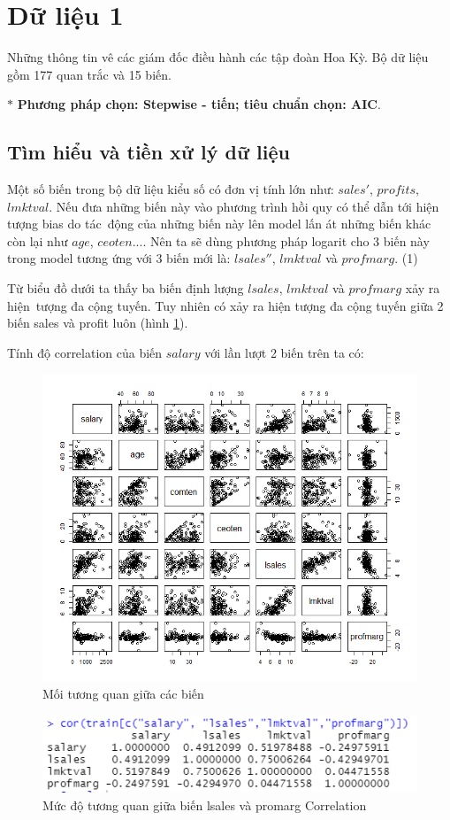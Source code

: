 \section{Dữ liệu 1}
Những thông tin vê các giám đốc điều hành các tập đoàn Hoa Kỳ. Bộ dữ liệu gồm 177 quan trắc và 15 biến.

$*$ \textbf{Phương pháp chọn: Stepwise - tiến; tiêu chuẩn chọn: AIC}.
\subsection*{Tìm hiểu và tiền xử lý dữ liệu}

Một số biến trong bộ dữ liệu kiểu số có đơn vị tính lớn như: $sales'$, $profits$, $lmktval$. Nếu đưa những biến này vào phương trình hồi quy có thể dẫn tới hiện tượng bias do tác~động của những biến này lên model lấn át những biến khác còn lại như $age$, $ceoten$.... Nên ta sẽ dùng phương pháp logarit cho 3 biến này trong model tương ứng với 3 biến mới là:  $lsales''$, $lmktval$   và $profmarg$. (1)


Từ biểu đồ dưới ta thấy ba biến định lượng $\textit{lsales}$, $\textit{lmktval}$ và $\textit{profmarg}$ xảy ra hiện~tượng đa cộng tuyến.
Tuy nhiên có xảy ra hiện tượng đa cộng tuyến giữa 2 biến sales và profit luôn (hình \ref{fig-b1:plot-vars}).

Tính độ correlation của biến $salary$ với lần lượt 2 biến trên ta có:

\begin{figure}[H]
	\centering
	\includegraphics[width=.7\linewidth]{../Photo Of Result/B1_plotVriables.png}  
	\caption{Mối tương quan giữa các biến}
	\label{fig-b1:plot-vars}
\end{figure}

\begin{figure}[H]
	\centering
	\includegraphics[width=.7\linewidth]{../Photo Of Result/B1_CorTable.PNG}  
	\caption{Mức độ tương quan giữa biến lsales và promarg Correlation}
	\label{fig-b1:corr-table}
\end{figure}

